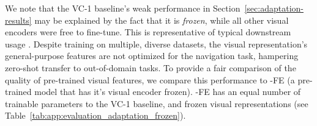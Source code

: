 We note that the VC-1 baseline's weak performance in Section~\ref{sec:adaptation-results} may be explained by the fact that it is \emph{frozen}, while all other visual encoders were free to fine-tune. This is representative of typical downstream usage \cite{majumdar2023vc1}. Despite training on multiple, diverse datasets, the visual representation's general-purpose features are not optimized for the navigation task, hampering zero-shot transfer to out-of-domain tasks. To provide a fair comparison of the quality of pre-trained visual features, we compare this performance to \ModelName-FE (a pre-trained \ModelName model that has it's visual encoder frozen). \ModelName-FE has an equal number of trainable parameters to the VC-1 baseline, and frozen visual representations (see Table~\ref{tab:app:evaluation_adaptation_frozen}).








